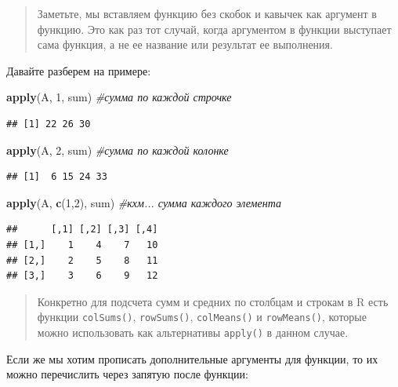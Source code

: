 \documentclass[]{book}
\newenvironment{Shaded}{\begin{snugshade}}{\end{snugshade}}
\newcommand{\KeywordTok}[1]{\textcolor[rgb]{0.13,0.29,0.53}{\textbf{#1}}}
\newcommand{\DecValTok}[1]{\textcolor[rgb]{0.00,0.00,0.81}{#1}}
\newcommand{\CommentTok}[1]{\textcolor[rgb]{0.56,0.35,0.01}{\textit{#1}}}
\newcommand{\NormalTok}[1]{#1}
\begin{document}
\begin{quote}
Заметьте, мы вставляем функцию без скобок и кавычек как аргумент в
функцию. Это как раз тот случай, когда аргументом в функции выступает
сама функция, а не ее название или результат ее выполнения.
\end{quote}

Давайте разберем на примере:

\begin{Shaded}
\begin{Highlighting}[]
\KeywordTok{apply}\NormalTok{(A, }\DecValTok{1}\NormalTok{, sum) }\CommentTok{#сумма по каждой строчке}
\end{Highlighting}
\end{Shaded}

\begin{verbatim}
## [1] 22 26 30
\end{verbatim}

\begin{Shaded}
\begin{Highlighting}[]
\KeywordTok{apply}\NormalTok{(A, }\DecValTok{2}\NormalTok{, sum) }\CommentTok{#сумма по каждой колонке}
\end{Highlighting}
\end{Shaded}

\begin{verbatim}
## [1]  6 15 24 33
\end{verbatim}

\begin{Shaded}
\begin{Highlighting}[]
\KeywordTok{apply}\NormalTok{(A, }\KeywordTok{c}\NormalTok{(}\DecValTok{1}\NormalTok{,}\DecValTok{2}\NormalTok{), sum) }\CommentTok{#кхм... сумма каждого элемента}
\end{Highlighting}
\end{Shaded}

\begin{verbatim}
##      [,1] [,2] [,3] [,4]
## [1,]    1    4    7   10
## [2,]    2    5    8   11
## [3,]    3    6    9   12
\end{verbatim}

\begin{quote}
Конкретно для подсчета сумм и средних по столбцам и строкам в R есть
функции \texttt{colSums()}, \texttt{rowSums()}, \texttt{colMeans()} и
\texttt{rowMeans()}, которые можно использовать как альтернативы
\texttt{apply()} в данном случае.
\end{quote}

Если же мы хотим прописать дополнительные аргументы для функции, то их
можно перечислить через запятую после функции:
\end{document}
